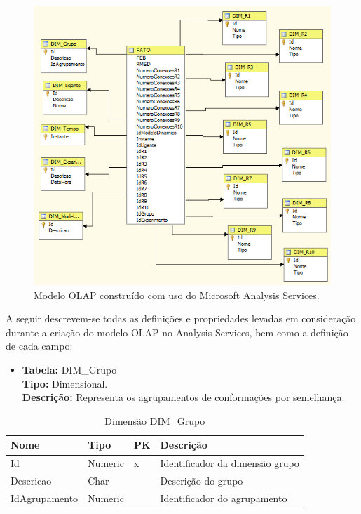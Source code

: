 \begin{figure}[h]
        \center
        \includegraphics[scale=1]{images/ModelagemOLAP.PNG}
        \caption{Modelo OLAP construído com uso do Microsoft Analysis Services.}
        \label{fig:ModeloOLAP}
\end{figure}

A seguir descrevem-se todas as definições e propriedades levadas em consideração durante a criação do modelo OLAP no Analysis Services, bem como a definição de cada campo:
	
\begin{itemize}
	\item
		\textbf{Tabela:} DIM\_Grupo \\
		\textbf{Tipo:} Dimensional. \\
		\textbf{Descrição:} Representa os agrupamentos de conformações por semelhança.
\end{itemize}
\begin{table}[h]
	\caption{Dimensão DIM\_Grupo}
	\centering
	\begin{tabular}{@{}llll@{}}
	\toprule
	\textbf{Nome} & \textbf{Tipo} & \textbf{PK} & \textbf{Descrição}           		\\ \midrule
	Id            & Numeric           & x           & Identificador da dimensão grupo   \\
	Descricao     & Char       &             & Descrição do grupo           		\\
	IdAgrupamento & Numeric          &             & Identificador do agrupamento 		\\ \bottomrule
	\end{tabular}
\end{table}

